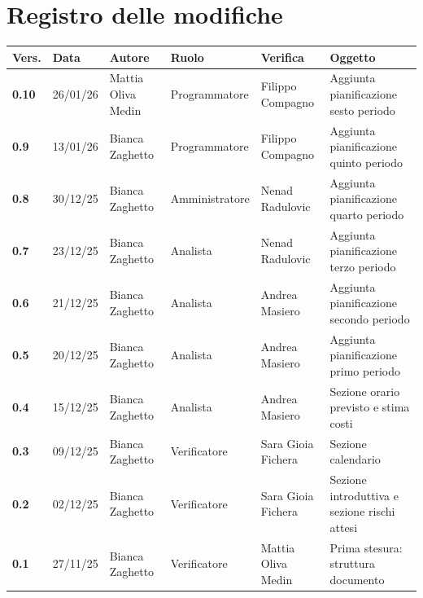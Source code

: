\documentclass[a4paper,12pt]{article}
\begin{document}


\newpage
\section*{Registro delle modifiche}

\begin{table}[h!]
\begin{tabularx}{\textwidth}{|l|l|l|l|L|L|}
\hline
\textbf{Vers.} & \textbf{Data} & \textbf{Autore} & \textbf{Ruolo} & \textbf{Verifica} & \textbf{Oggetto} \\
\hline
\textbf{0.10} & 26/01/26 & Mattia Oliva Medin & Programmatore & Filippo Compagno & Aggiunta pianificazione sesto periodo \\
\hline
\textbf{0.9} & 13/01/26 & Bianca Zaghetto & Programmatore & Filippo Compagno & Aggiunta pianificazione quinto periodo \\
\hline
\textbf{0.8} & 30/12/25 & Bianca Zaghetto & Amministratore & Nenad Radulovic & Aggiunta pianificazione quarto periodo \\
\hline
\textbf{0.7} & 23/12/25 & Bianca Zaghetto & Analista & Nenad Radulovic & Aggiunta pianificazione terzo periodo \\
\hline
\textbf{0.6} & 21/12/25 & Bianca Zaghetto & Analista & Andrea Masiero & Aggiunta pianificazione secondo periodo \\
\hline
\textbf{0.5} & 20/12/25 & Bianca Zaghetto & Analista & Andrea Masiero & Aggiunta pianificazione primo periodo \\
\hline
\textbf{0.4} & 15/12/25 & Bianca Zaghetto & Analista & Andrea Masiero & Sezione orario previsto e stima costi \\
\hline
\textbf{0.3} & 09/12/25 & Bianca Zaghetto & Verificatore & Sara Gioia Fichera & Sezione calendario \\
\hline
\textbf{0.2} & 02/12/25 & Bianca Zaghetto & Verificatore & Sara Gioia Fichera & Sezione introduttiva e sezione rischi attesi \\
\hline
\textbf{0.1} & 27/11/25 & Bianca Zaghetto & Verificatore & Mattia Oliva Medin & Prima stesura: struttura documento \\
\hline
\end{tabularx}
\end{table}

\newpage
\tableofcontents

\newpage
\listoffigures

\newpage
\listoftables
\end{document}

